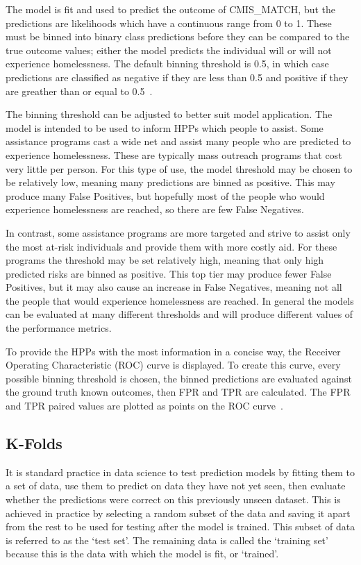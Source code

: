 \documentclass[10pt,letterpaper]{article}
\newcommand{\red}[1]{{\color{red}{#1}}}
\begin{document}
The model is fit and used to predict the outcome of CMIS\_MATCH, but the predictions are likelihoods which have a continuous range from 0 to 1. These must be binned into binary class predictions before they can be compared to the true outcome values; either the model predicts the individual will or will not experience homelessness. The default binning threshold is 0.5, in which case predictions are classified as negative if they are less than 0.5 and positive if they are greather than or equal to 0.5~\cite{bewick2005statistics}. 

The binning threshold can be adjusted to better suit model application. The model is intended to be used to inform HPPs which people to assist. Some assistance programs cast a wide net and assist many people who are predicted to experience homelessness. These are typically mass outreach programs that cost very little per person. For this type of use, the model threshold may be chosen to be relatively low, meaning many predictions are binned as positive. This may produce many False Positives, but hopefully most of the people who would experience homelessness are reached, so there are few False Negatives. 

In contrast, some assistance programs are more targeted and strive to assist only the most at-risk individuals and provide them with more costly aid. For these programs the threshold may be set relatively high, meaning that only high predicted risks are binned as positive. This top tier may produce fewer False Positives, but it may also cause an increase in False Negatives, meaning not all the people that would experience homelessness are reached. In general the models can be evaluated at many different thresholds and will produce different values of the performance metrics.

To provide the HPPs with the most information in a concise way, the Receiver Operating Characteristic (ROC) curve is displayed. To create this curve, every possible binning threshold is chosen, the binned predictions are evaluated against the ground truth known outcomes, then FPR and TPR are calculated. The FPR and TPR paired values are plotted as points on the ROC curve~\cite{fawcett2006introduction}.

\subsection*{K-Folds}
It is standard practice in data science to test prediction models by fitting them to a set of data, use them to predict on data they have not yet seen, then evaluate whether the predictions were correct on this previously unseen dataset. This is achieved in practice by selecting a random subset of the data and saving it apart from the rest to be used for testing after the model is trained. This subset of data is referred to as the `test set'. The remaining data is called the `training set' because this is the data with which the model is fit, or `trained'. \red{remove previous paragraph?}
\end{document}
